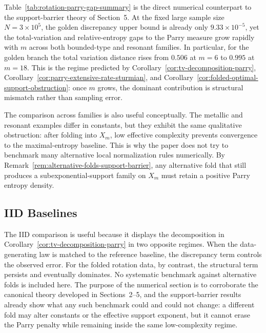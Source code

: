\documentclass[11pt,letterpaper]{article}
\numberwithin{equation}{section}
\theoremstyle{plain}
\theoremstyle{definition}
\theoremstyle{remark}
\begin{document}


Table~\ref{tab:rotation-parry-gap-summary} is the direct numerical counterpart
to the support-barrier theory of Section~5. At the fixed large sample size
\(N=3\times 10^5\), the golden discrepancy upper bound is already only
\(9.33\times 10^{-5}\), yet the total-variation and relative-entropy gaps to
the Parry measure grow rapidly with \(m\) across both bounded-type and
resonant families. In particular, for the golden branch the total variation
distance rises from \(0.506\) at \(m=6\) to \(0.995\) at \(m=18\). This is the
regime predicted by Corollary~\ref{cor:tv-decomposition-parry},
Corollary~\ref{cor:parry-extensive-rate-sturmian}, and
Corollary~\ref{cor:folded-optimal-support-obstruction}: once \(m\) grows, the
dominant contribution is structural mismatch rather than sampling error.

The comparison across families is also useful conceptually. The metallic and
resonant examples differ in constants, but they exhibit the same qualitative
obstruction: after folding into \(X_m\), low effective complexity prevents
convergence to the maximal-entropy baseline. This is why the paper does not try
to benchmark many alternative local normalization rules numerically. By
Remark~\ref{rem:alternative-folds-support-barrier}, any alternative fold that
still produces a subexponential-support family on \(X_m\) must retain a
positive Parry entropy density.

\subsection{IID Baselines}



The IID comparison is useful because it displays the decomposition in
Corollary~\ref{cor:tv-decomposition-parry} in two opposite regimes. When the
data-generating law is matched to the reference baseline, the discrepancy term
controls the observed error. For the folded rotation data, by contrast, the
structural term persists and eventually dominates.
No systematic benchmark against alternative folds is included here. The purpose
of the numerical section is to corroborate the canonical theory developed in
Sections~2--5, and the support-barrier results already show what any such
benchmark could and could not change: a different fold may alter constants or
the effective support exponent, but it cannot erase the Parry penalty while
remaining inside the same low-complexity regime.
\end{document}
